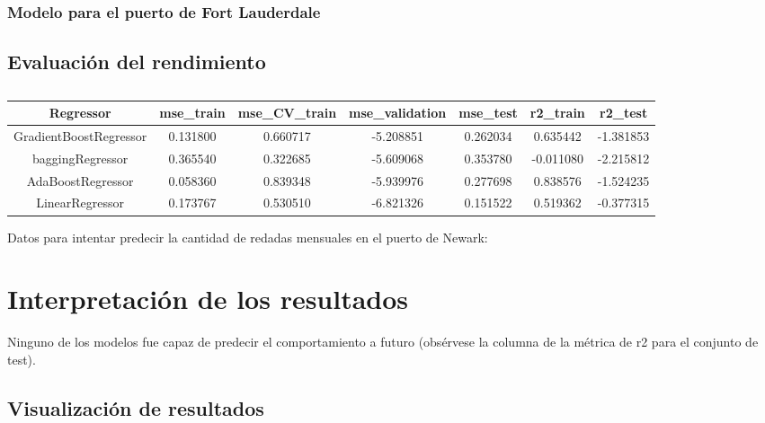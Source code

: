 \documentclass[12pt]{article}
\begin{document}
 	\subsubsection{\label{FL model} Modelo para el puerto de Fort Lauderdale}


	\subsection{\label{eval performance}Evaluación del rendimiento}
	\begingroup
	\begin{table}[H]
	\caption{\label{tabla}}
		\centering
		\setlength{\tabcolsep}{3pt}
		\renewcommand{\arraystretch}{1.5}
		\begin{tabular}{|c|c|c|c|c|c|c|}
			\hline
			Regressor &	mse\_train &	mse\_CV\_train &	mse\_validation &	mse\_test &	r2\_train &	r2\_test \\
			\hline
			GradientBoostRegressor &	0.131800 &	0.660717 &	-5.208851 &	0.262034 &	0.635442 &	-1.381853 \\
			baggingRegressor &	0.365540 &	0.322685 &	-5.609068 &	0.353780 &	-0.011080 &	-2.215812 \\
			AdaBoostRegressor &	0.058360 &	0.839348 &	-5.939976 &	0.277698 &	0.838576 &	-1.524235 \\
			LinearRegressor &	0.173767 &	0.530510 &	-6.821326 &	0.151522 &	0.519362 &	-0.377315 \\
			\hline
		\end{tabular}
	\end{table}
	\endgroup

	Datos para intentar predecir la cantidad de redadas mensuales en el puerto de Newark:
	

\newpage
\section{\label{interpretacion}Interpretación de los resultados}
Ninguno de los modelos fue capaz de predecir el comportamiento a futuro (obsérvese la columna de la métrica de r2 para el conjunto de test).

	\subsection{Visualización de resultados}
	
\end{document}
